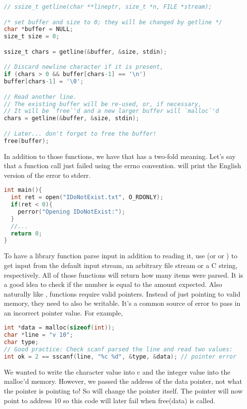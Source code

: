 \begin{lstlisting}[language=C]
// ssize_t getline(char **lineptr, size_t *n, FILE *stream);

/* set buffer and size to 0; they will be changed by getline */
char *buffer = NULL;
size_t size = 0;

ssize_t chars = getline(&buffer, &size, stdin);

// Discard newline character if it is present,
if (chars > 0 && buffer[chars-1] == '\n')
buffer[chars-1] = '\0';

// Read another line.
// The existing buffer will be re-used, or, if necessary,
// It will be `free`'d and a new larger buffer will `malloc`'d
chars = getline(&buffer, &size, stdin);

// Later... don't forget to free the buffer!
free(buffer);
\end{lstlisting}

In addition to those functions, we have  that has a two-fold meaning.
Let's say that a function call just failed using the errno convention.
 will print the English version of the error to stderr.

\begin{lstlisting}[language=C]
int main(){
  int ret = open("IDoNotExist.txt", O_RDONLY);
  if(ret < 0){
    perror("Opening IDoNotExist:");
  }
  //...
  return 0;
}
\end{lstlisting}

To have a library function parse input in addition to reading it, use  (or  or ) to get input from the default input stream, an arbitrary file stream or a C string, respectively.
All of those functions will return how many items were parsed.
It is a good idea to check if the number is equal to the amount expected.
Also naturally like ,  functions require valid pointers.
Instead of just pointing to valid memory, they need to also be writable.
It's a common source of error to pass in an incorrect pointer value.
For example,

\begin{lstlisting}[language=C]
int *data = malloc(sizeof(int));
char *line = "v 10";
char type;
// Good practice: Check scanf parsed the line and read two values:
int ok = 2 == sscanf(line, "%c %d", &type, &data); // pointer error
\end{lstlisting}

We wanted to write the character value into c and the integer value into the malloc'd memory.
However, we passed the address of the data pointer, not what the pointer is pointing to!
So  will change the pointer itself.
The pointer will now point to address 10 so this code will later fail when free(data) is called.

